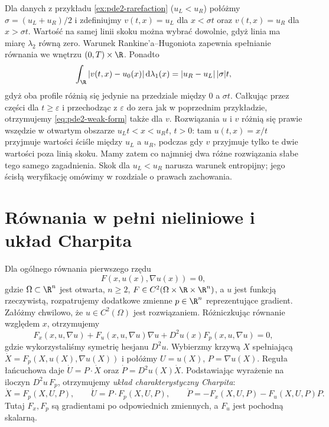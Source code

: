 \begin{uwaga}
Dla danych z przykładu \ref{ex:pde2-rarefaction}
($u_L<u_R$) połóżmy $\sigma=(u_L+u_R)/2$ i zdefiniujmy
$v(t,x)=u_L$ dla $x<\sigma t$ oraz $v(t,x)=u_R$
dla $x>\sigma t$. Wartość na samej linii skoku
można wybrać dowolnie, gdyż linia ma miarę $\lambda_2$
równą zero. Warunek Rankine'a--Hugoniota zapewnia
spełnianie równania we wnętrzu $(0,T)\times\R$.
Ponadto
\[
 \int_\R |v(t,x)-u_0(x)|\,\mathrm d\lambda_1(x)
 =|u_R-u_L|\,|\sigma|t,
\]
gdyż oba profile różnią się jedynie na przedziale
między $0$ a $\sigma t$. Całkując przez części
dla $t\geq\varepsilon$ i przechodząc z $\varepsilon$
do zera jak w poprzednim przykładzie, otrzymujemy
\eqref{eq:pde2-weak-form} także dla $v$.
Rozwiązania $u$ i $v$ różnią się prawie wszędzie
w otwartym obszarze $u_Lt<x<u_Rt$, $t>0$:
tam $u(t,x)=x/t$ przyjmuje wartości ściśle między
$u_L$ a $u_R$, podczas gdy $v$ przyjmuje tylko te
dwie wartości poza linią skoku.
Mamy zatem co najmniej dwa różne rozwiązania słabe
tego samego zagadnienia. Skok dla $u_L<u_R$ narusza
warunek entropijny; jego ścisłą weryfikację omówimy
w rozdziale o prawach zachowania.
\end{uwaga}

\section{Równania w pełni nieliniowe i układ Charpita}
\label{sec:pde2-charpit}

Dla ogólnego równania pierwszego rzędu
\begin{equation}\label{eq:pde2-general-F}
 F(x,u(x),\nabla u(x))=0,
\end{equation}
gdzie $\Omega\subset\R^n$ jest otwarta, $n\geq2$,
$F\in C^2(\Omega\times\R\times\R^n)$, a $u$ jest
funkcją rzeczywistą, rozpatrujemy dodatkowe zmienne
$p\in\R^n$ reprezentujące gradient.
Załóżmy chwilowo, że $u\in C^2(\Omega)$ jest rozwiązaniem.
Różniczkując równanie względem $x$, otrzymujemy
\[
 F_x(x,u,\nabla u)+F_u(x,u,\nabla u)\nabla u
 +D^2u(x)F_p(x,u,\nabla u)=0,
\]
gdzie wykorzystaliśmy symetrię hesjanu $D^2u$.
Wybierzmy krzywą $X$ spełniającą
$\dot X=F_p(X,u(X),\nabla u(X))$ i połóżmy
$U=u(X)$, $P=\nabla u(X)$. Reguła łańcuchowa daje
$\dot U=P\cdot\dot X$ oraz $\dot P=D^2u(X)\dot X$.
Podstawiając wyrażenie na iloczyn $D^2u\,F_p$, otrzymujemy
\emph{układ charakterystyczny Charpita}:
\begin{equation}\label{eq:pde2-charpit-system}
 \dot X=F_p(X,U,P),\qquad
 \dot U=P\cdot F_p(X,U,P),\qquad
 \dot P=-F_x(X,U,P)-F_u(X,U,P)P.
\end{equation}
Tutaj $F_x,F_p$ są gradientami po odpowiednich
zmiennych, a $F_u$ jest pochodną skalarną.

